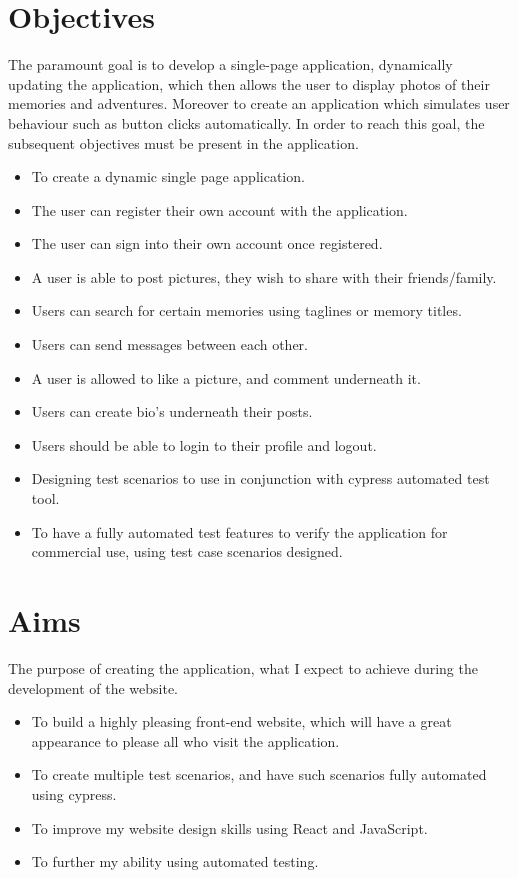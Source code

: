 \section{Objectives}\label{section:objectives}
The paramount goal is to develop a single-page application, dynamically updating the application, which then allows the user to display photos of their memories and adventures. Moreover to create an application which simulates user behaviour such as button clicks automatically. In order to reach this goal, the subsequent objectives must be present in the application.
\begin{itemize}
    \item To create a dynamic single page application.
    \item The user can register their own account with the application.
    \item The user can sign into their own account once     	registered.
    \item A user is able to post pictures, they wish to share with their friends/family.
    \item Users can search for certain memories using taglines or memory titles.
    \item Users can send messages between each other.
    \item A user is allowed to like a picture, and comment underneath it.
    \item Users can create bio's underneath their posts.
    \item Users should be able to login to their profile and logout.
    \item Designing test scenarios to use in conjunction with cypress automated test tool. 
    \item To have a fully automated test features to verify    the application for commercial use, using test case scenarios designed.
\end{itemize}

\section{Aims}
The purpose of creating the application, what I expect to achieve during the development of the website.
\begin{itemize}
    \item To build a highly pleasing front-end website, which will have a great appearance to please all who visit the application.
    \item To create multiple test scenarios, and have such scenarios fully automated using cypress.
    \item To improve my website design skills using React and JavaScript.
    \item To further my ability using automated testing.
\end{itemize}

